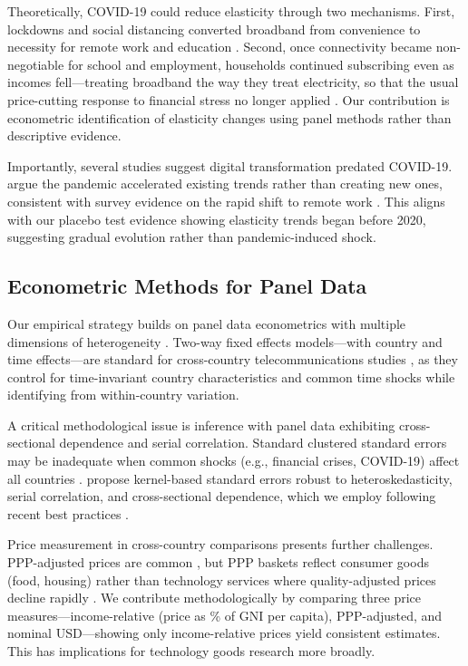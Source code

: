 Theoretically, COVID-19 could reduce elasticity through two mechanisms. 
First, lockdowns and social distancing converted broadband from convenience to 
necessity for remote work and education \citep{brynjolfsson2020covid}. 
Second, once connectivity became non-negotiable for school and employment, 
households continued subscribing even as incomes fell---treating broadband 
the way they treat electricity, so that the usual price-cutting response to 
financial stress no longer applied \citep{dietrich2020consumption}. Our contribution is econometric identification of elasticity changes using panel methods rather than descriptive evidence.

Importantly, several studies suggest digital transformation predated COVID-19. \citet{goldfarb2020digital} argue the pandemic accelerated existing trends rather than creating new ones, consistent with survey evidence on the rapid shift to remote work \citep{brynjolfsson2020covid}. This aligns with our placebo test evidence showing elasticity trends began before 2020, suggesting gradual evolution rather than pandemic-induced shock.

\subsection{Econometric Methods for Panel Data}

Our empirical strategy builds on panel data econometrics with multiple dimensions of heterogeneity \citep{wooldridge2010econometric, baltagi2021econometric}. Two-way fixed effects models---with country and time effects---are standard for cross-country telecommunications studies \citep{koutroumpis2009impact, czernich2011broadband}, as they control for time-invariant country characteristics and common time shocks while identifying from within-country variation.

A critical methodological issue is inference with panel data exhibiting cross-sectional dependence and serial correlation. Standard clustered standard errors may be inadequate when common shocks (e.g., financial crises, COVID-19) affect all countries \citep{cameron2015practitioner}. \citet{driscoll1998consistent} propose kernel-based standard errors robust to heteroskedasticity, serial correlation, and cross-sectional dependence, which we employ following recent best practices \citep{petersen2009estimating, cameron2015practitioner}.

Price measurement in cross-country comparisons presents further challenges. PPP-adjusted prices are common \citep{worldbank2020icp}, but PPP baskets reflect consumer goods (food, housing) rather than technology services where quality-adjusted prices decline rapidly \citep{schreyer2002oecd}. We contribute methodologically by comparing three price measures---income-relative (price as \% of GNI per capita), PPP-adjusted, and nominal USD---showing only income-relative prices yield consistent estimates. This has implications for technology goods research more broadly.

